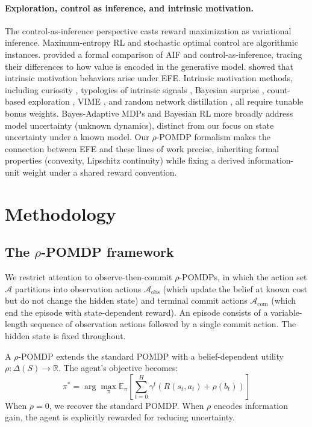 \documentclass[runningheads]{llncs}
\begin{document}
\paragraph{Exploration, control as inference, and intrinsic motivation.}
The control-as-inference perspective \citep{todorov2007, levine2018} casts reward maximization as variational inference. Maximum-entropy RL \citep{haarnoja2018} and stochastic optimal control \citep{rawlik2012} are algorithmic instances. \citet{millidge2020} provided a formal comparison of AIF and control-as-inference, tracing their differences to how value is encoded in the generative model. \citet{sajid2021} showed that intrinsic motivation behaviors arise under EFE. Intrinsic motivation methods, including curiosity \citep{schmidhuber1991, pathak2017}, typologies of intrinsic signals \citep{oudeyer2007}, Bayesian surprise \citep{itti2009}, count-based exploration \citep{bellemare2016}, VIME \citep{houthooft2016}, and random network distillation \citep{burda2019}, all require tunable bonus weights. Bayes-Adaptive MDPs \citep{duff2002, guez2013} and Bayesian RL more broadly \citep{ghavamzadeh2015} address model uncertainty (unknown dynamics), distinct from our focus on state uncertainty under a known model. Our $\rho$-POMDP formalism makes the connection between EFE and these lines of work precise, inheriting formal properties (convexity, Lipschitz continuity) while fixing a derived information-unit weight under a shared reward convention.

\section{Methodology}
\label{sec:methodology}

\subsection{The $\rho$-POMDP framework}

We restrict attention to observe-then-commit $\rho$-POMDPs, in which the action set $\mathcal{A}$ partitions into observation actions $\mathcal{A}_\text{obs}$ (which update the belief at known cost but do not change the hidden state) and terminal commit actions $\mathcal{A}_\text{com}$ (which end the episode with state-dependent reward). An episode consists of a variable-length sequence of observation actions followed by a single commit action. The hidden state is fixed throughout.

A $\rho$-POMDP extends the standard POMDP with a belief-dependent utility $\rho : \Delta(S) \rightarrow \mathbb{R}$. The agent's objective becomes:
\begin{equation}
    \pi^* = \arg\max_\pi \mathbb{E}_\pi \left[ \sum_{t=0}^{H} \gamma^t \left( R(s_t, a_t) + \rho(b_t) \right) \right]
\end{equation}
When $\rho = 0$, we recover the standard POMDP. When $\rho$ encodes information gain, the agent is explicitly rewarded for reducing uncertainty.
\end{document}
